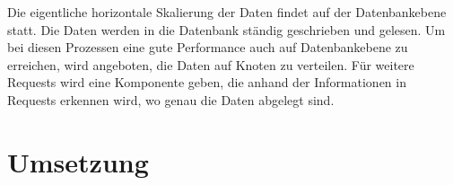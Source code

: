 Die eigentliche horizontale Skalierung der Daten findet auf der Datenbankebene statt. Die Daten werden in die Datenbank ständig geschrieben und gelesen. Um bei diesen Prozessen eine gute Performance auch auf Datenbankebene zu erreichen, wird angeboten, die Daten auf Knoten zu verteilen. Für weitere Requests wird eine Komponente geben, die anhand der Informationen in Requests erkennen wird, wo genau die Daten abgelegt sind. 


\section{Umsetzung}





